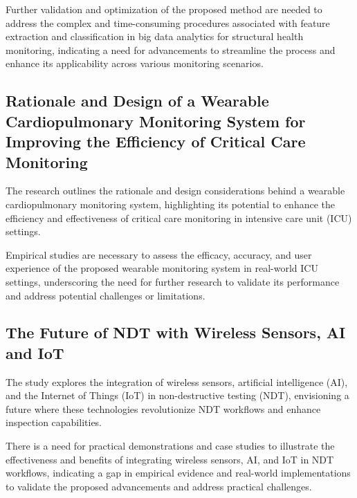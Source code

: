 \documentclass[journal, a4paper]{IEEEtran}
\begin{document}
\begin{description}[style=standard, font=\normalfont]
  \item[Research gap:] Further validation and optimization of the proposed method are needed to address the complex and time-consuming procedures associated with feature extraction and classification in big data analytics for structural health monitoring, indicating a need for advancements to streamline the process and enhance its applicability across various monitoring scenarios.
\end{description}

 
\subsection{Rationale and Design of a Wearable Cardiopulmonary Monitoring System for Improving the Efficiency of Critical Care Monitoring}
The research outlines the rationale and design considerations behind a wearable cardiopulmonary monitoring system, highlighting its potential to enhance the efficiency and effectiveness of critical care monitoring in intensive care unit (ICU) settings. 

\begin{description}[style=standard, font=\normalfont]
  \item[Research gap:] Empirical studies are necessary to assess the efficacy, accuracy, and user experience of the proposed wearable monitoring system in real-world ICU settings, underscoring the need for further research to validate its performance and address potential challenges or limitations.
\end{description}


\subsection{The Future of NDT with Wireless Sensors, AI and IoT}
The study explores the integration of wireless sensors, artificial intelligence (AI), and the Internet of Things (IoT) in non-destructive testing (NDT), envisioning a future where these technologies revolutionize NDT workflows and enhance inspection capabilities. 

\begin{description}[style=standard, font=\normalfont]
  \item[Research gap:] There is a need for practical demonstrations and case studies to illustrate the effectiveness and benefits of integrating wireless sensors, AI, and IoT in NDT workflows, indicating a gap in empirical evidence and real-world implementations to validate the proposed advancements and address practical challenges.
\end{description}
\end{document}
